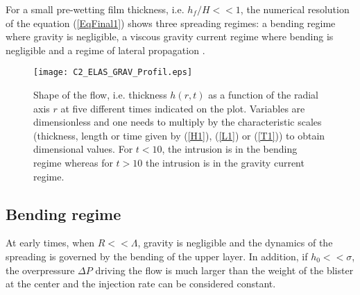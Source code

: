 For  a  small  pre-wetting   film  thickness,  i.e.   $h_f/H<<1$,  the
numerical  resolution of  the  equation  (\ref{EqFinal1}) shows  three
spreading regimes:  a bending  regime where  gravity is  negligible, a
viscous  gravity current  regime  where bending  is  negligible and  a
regime               of              lateral               propagation
\citep{Michaut:2011kg,Bunger:2011cb,Lister:2013ia}.

\begin{figure}[h!]
  \begin{center}
    \graphicspath{ {/Users/thorey/Documents/These/Manuscript/Figure/Chapter2/} }
    \texttt{[image: C2\_ELAS\_GRAV\_Profil.eps]}
    \caption{Shape of the flow, i.e.  thickness $h(r,t)$ as a function
      of the radial axis $r$ at  five different times indicated on the
      plot. Variables are  dimensionless and one needs  to multiply by
      the characteristic  scales (thickness,  length or time  given by
      (\ref{H1}),  (\ref{L1})  or  (\ref{T1})) to  obtain  dimensional
      values.   For $t<10$,  the intrusion  is in  the bending  regime
      whereas  for $t>10$  the  intrusion is  in  the gravity  current
      regime.}
    \label{C2_ELAS_GRAV_Profil}
  \end{center}
\end{figure}

\subsection{Bending regime}
\label{C2-sec:bending-regime}

At  early times,  when  $R<<\Lambda$, gravity  is  negligible and  the
dynamics of  the spreading  is governed  by the  bending of  the upper
layer.   In addition,  if $h_0<<\sigma$,  the overpressure  $\Delta P$
driving the flow is much larger than  the weight of the blister at the
center and the injection rate can be considered constant.

